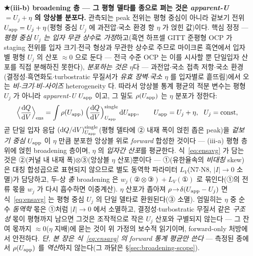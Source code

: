 \textbf{★(iii-b) broadening 층 --- 그 평형 델타를 종으로 펴는 것은 \emph{apparent-U $=U_j+\eta$} 의 앙상블 분포다.} 관측되는 peak
전위는 평형 중심이 아니라 겉보기 전위 $U_{\mathrm{app}}=U_j+\eta$(평형 중심 $U_j$ 에 과전압$\cdot$국소 환경 항 $\eta$ 가 얹힌
값)이다. 핵심 정정 --- \emph{평형 중심 $U_j$ 는 입자 무관 상수}로 \emph{가정}하고(흑연 하프셀 GITT 준평형 OCP 가 staging 전위를
입자 크기$\cdot$전극 형상과 무관한 상수로 주므로\cite{park2021} 마이크론 흑연에서 입자별 평형 $U_j$ 의 산포 $\approx0$ 으로 둔다 ---
전극 수준 OCP 는 이를 시사할 뿐 단일입자 산포를 직접 분해하진 못한다), \emph{분포하는 것은 $\eta$}다 ---
과전압$\cdot$국소 접촉 저항$\cdot$국소 환경(결정성$\cdot$흑연화도$\cdot$turbostratic 무질서가 \emph{유효 장벽$\cdot$국소
$\eta$} 를 입자별로 흩뜨림)에서 오는 \emph{비-크기$\cdot$비-사이즈} heterogeneity 다. 따라서 앙상블 통계 평균의 적분
변수는 평형 $U_j$ 가 아니라 \emph{apparent-U} $U_{\mathrm{app}}$ 이고, 그 밀도 $\rho(U_{\mathrm{app}})$ 는 $\eta$ 분포가 정한다:
\begin{equation}
\Big\langle\frac{\mathrm{d} Q}{\mathrm{d} V}\Big\rangle_\mathrm{ens}
=\int \rho(U_{\mathrm{app}})\;\Big(\frac{\mathrm{d} Q}{\mathrm{d} V}\Big)^\mathrm{single}_{U_{\mathrm{app}}}\,\mathrm{d} U_{\mathrm{app}},
\qquad U_{\mathrm{app}}=U_j+\eta,\ \ U_j=\text{const},
\label{eq:ensavg}
\end{equation}
곧 단일 입자 응답 $(\mathrm{d} Q/\mathrm{d} V)^\mathrm{single}_{U_{\mathrm{app}}}$(평형 델타에 ② 내재 폭이 얹힌 좁은 peak)을 \emph{겉보기 중심}
$U_{\mathrm{app}}$ 이 $\eta$ 만큼 분포한 앙상블 위로 \emph{forward} 합성한 것이다 --- (iii-a) 평형 층 위에 얹힌
broadening 층이며, $\eta$ 의 \emph{입자간 산포}를 평균한다. 식~\eqref{eq:ensavg} 가 담는 것은
②(커널 내 내재 폭)$\otimes$③(앙상블 $\eta$ 산포)뿐이다 --- ①(유한율속의 \emph{비대칭} skew)은 대칭 합성곱으로
표현되지 않으므로 별도 동역학 파라미터 $L_V$(N7$\cdot$N8, $|I|\!\to\!0$ 소멸)가 담당하고, 두-상 \emph{총}
broadening 은 $w_j(\text{②}\otimes\text{③})+L_V(\text{①})$ 로 묶인다(①의 전류 몫을 $w_j$ 가 다시 흡수하면
이중계산). $\eta$ 산포가 좁아져 $\rho\!\to\!\delta(U_{\mathrm{app}}-U_j)$ 면 식~\eqref{eq:ensavg} 는 평형 중심 $U_j$
의 단일 델타로 환원된다(③ 소멸).
엄밀히는 $\eta$ 중 순수 \emph{동역학} 몫은 ①처럼 $|I|\!\to\!0$ 에서 소멸하고, 결정성$\cdot$turbostratic 무질서 같은
\emph{구조성} 몫이 평형까지 남으면 그것은 조작적으로 작은 $U_j$ 산포와 구별되지 않는다 --- 그 잔여 몫까지
$\approx0$($\eta$ 지배)에 묻는 것이 위 가정의 보수적 읽기이며, forward-only 처방에서 안전하다. \emph{단, 본 장은 식~\eqref{eq:ensavg} 의 forward 통계 평균만
쓴다} --- 측정된 종에서 $\rho(U_{\mathrm{app}})$ 를 \emph{역산}하지 않는다(그 까닭은 \S\ref{sec:broadening-scope}).

